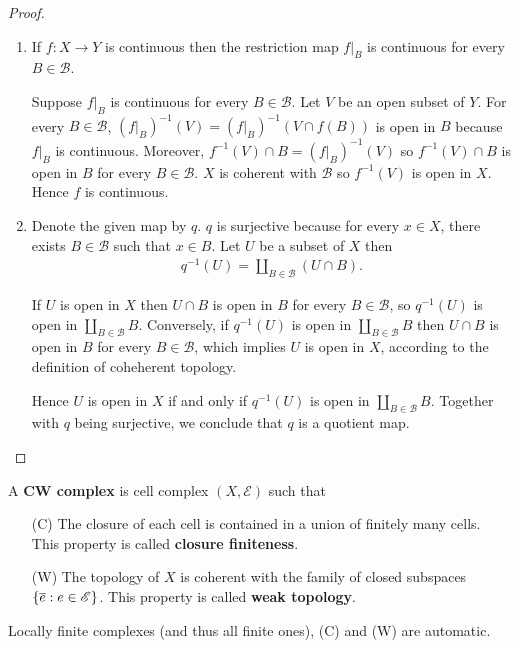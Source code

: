 \begin{proof}
	\begin{enumerate}[label={(\alph*)}]
		\item If $f: X\to Y$ is continuous then the restriction map $f\vert_{B}$ is continuous for every $B \in \mathscr{B}$.

		      Suppose $f\vert_{B}$ is continuous for every $B \in \mathscr{B}$. Let $V$ be an open subset of $Y$. For every $B \in \mathscr{B}$, ${(f\vert_{B})}^{-1}(V) = {(f\vert_{B})}^{-1}(V \cap f(B))$ is open in $B$ because $f\vert_{B}$ is continuous. Moreover, $f^{-1}(V) \cap B = {(f\vert_{B})}^{-1}(V)$ so $f^{-1}(V) \cap B$ is open in $B$ for every $B \in \mathscr{B}$. $X$ is coherent with $\mathscr{B}$ so $f^{-1}(V)$ is open in $X$. Hence $f$ is continuous.
		\item Denote the given map by $q$. $q$ is surjective because for every $x\in X$, there exists $B \in \mathscr{B}$ such that $x \in B$. Let $U$ be a subset of $X$ then
		      \begin{align*}
			      q^{-1}(U) = \coprod_{B\in\mathscr{B}} (U\cap B).
		      \end{align*}

		      If $U$ is open in $X$ then $U\cap B$ is open in $B$ for every $B\in\mathscr{B}$, so $q^{-1}(U)$ is open in $\coprod_{B\in\mathscr{B}}B$. Conversely, if $q^{-1}(U)$ is open in $\coprod_{B\in\mathscr{B}}B$ then $U\cap B$ is open in $B$ for every $B\in\mathscr{B}$, which implies $U$ is open in $X$, according to the definition of coheherent topology.

		      Hence $U$ is open in $X$ if and only if $q^{-1}(U)$ is open in $\coprod_{B\in\mathscr{B}}B$. Together with $q$ being surjective, we conclude that $q$ is a quotient map.
	\end{enumerate}
\end{proof}

A \textbf{CW complex} is cell complex $(X, \mathscr{E})$ such that
\begin{itemize}
	\item [(C)] The closure of each cell is contained in a union of finitely many cells. This property is called \textbf{closure finiteness}.
	\item [(W)] The topology of $X$ is coherent with the family of closed subspaces $\left\{{ \overline{e} : e \in \mathscr{E} }\right\}$. This property is called \textbf{weak topology}.
\end{itemize}

Locally finite complexes (and thus all finite ones), (C) and (W) are automatic.

